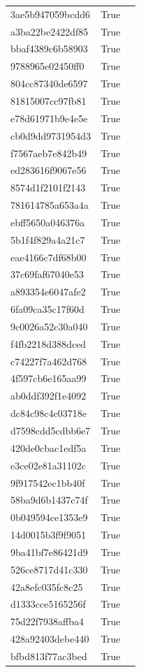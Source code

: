 \begin{tabular}{lrl}
3ae5b947059bcdd6 & True &  \\
a3ba22be2422df85 & True &  \\
bbaf4389c6b58903 & True &  \\
9788965e02450ff0 & True &  \\
804cc87340de6597 & True &  \\
81815007cc97fb81 & True &  \\
e78d61971b9e4e5e & True &  \\
cb0d9dd9731954d3 & True &  \\
f7567aeb7e842b49 & True &  \\
ed283616f9067e56 & True &  \\
8574d1f2101f2143 & True &  \\
781614785a653a4a & True &  \\
ebff5650a046376a & True &  \\
5b1f4f829a4a21c7 & True &  \\
eae4166c7df68b00 & True &  \\
37c69faf67040e53 & True &  \\
a893354e6047afe2 & True &  \\
6fa09ca35c17f60d & True &  \\
9c0026a52c30a040 & True &  \\
f4fb2218d388dced & True &  \\
c74227f7a462d768 & True &  \\
4f597cb6e165aa99 & True &  \\
ab0ddf392f1e4092 & True &  \\
dc84c98c4c03718e & True &  \\
d7598cdd5cdbb6e7 & True &  \\
420de0cbac1edf5a & True &  \\
e3ce02e81a31102c & True &  \\
9f917542ec1bb40f & True &  \\
58ba9d6b1437c74f & True &  \\
0b049594ce1353e9 & True &  \\
14d0015b3f9f9051 & True &  \\
9ba41bf7e86421d9 & True &  \\
526ce8717d41c330 & True &  \\
42a8efc035fc8c25 & True &  \\
d1333cce5165256f & True &  \\
75d22f7938affba4 & True &  \\
428a92403debe440 & True &  \\
bfbd813f77ac3bed & True &  \\

\end{tabular}
